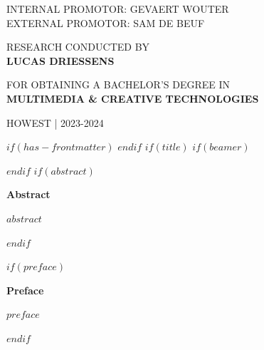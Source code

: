 \documentclass{article}
\begin{document}
\begin{titlepage}
\begin{adjustwidth}{1.5cm}{1.5cm}
    \vspace{2em}

    \noindent\MakeUppercase{\large{Internal promotor: Gevaert Wouter}} \\
    \MakeUppercase{\large{External promotor: Sam De beuf}}

    \vspace{2em}

    \noindent\MakeUppercase{\large{Research conducted by}} \\
    \MakeUppercase{\Large\textbf{Lucas Driessens}}

    \vspace{2em}

    \noindent\MakeUppercase{\large{for obtaining a bachelor's degree in}} \\
    \MakeUppercase{\Large\textbf{Multimedia \& Creative Technologies}}

    \vspace{1em}

    \noindent\MakeUppercase{\large{Howest | 2023-2024}}
    \end{adjustwidth}
    \restoregeometry
    \normalfont
\end{titlepage}

\selectfont

$if(has-frontmatter)$
\frontmatter
$endif$
$if(title)$
$if(beamer)$
\frame{\titlepage}



{} %

$endif$
$if(abstract)$
\begin{center}
 {\LARGE \textbf{\textsf{Abstract}}}
\end{center}

\begin{justify}
$abstract$
\end{justify}
\pagebreak
$endif$

$if(preface)$
\begin{center}
 {\LARGE \textbf{\textsf{Preface}}}
\end{center}

\begin{justify}
$preface$
\end{justify}
\pagebreak
$endif$
\end{document}
